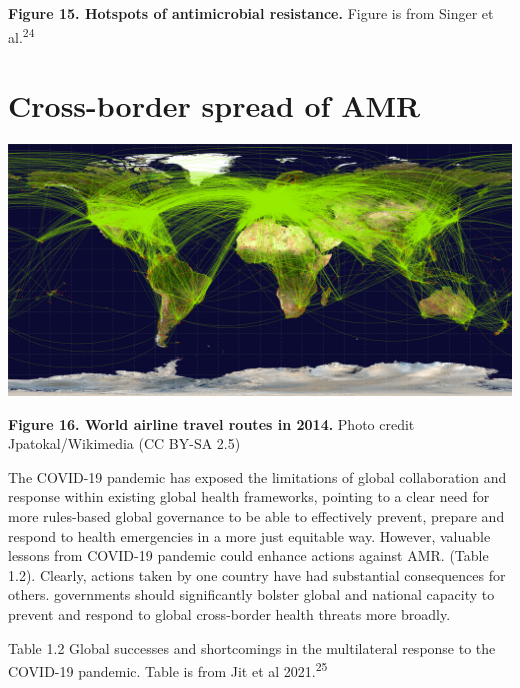 \documentclass[
]{book}
\begin{document}
\textbf{Figure 15. Hotspots of antimicrobial resistance.} Figure is from Singer et al.\textsuperscript{24}

\hypertarget{cross-border-spread-of-amr}{%
\section*{Cross-border spread of AMR}\label{cross-border-spread-of-amr}}

\includegraphics[width=8.33333in,height=\textheight]{images/worldairlineroute2014.png}

\textbf{Figure 16. World airline travel routes in 2014.} Photo credit Jpatokal/Wikimedia (CC BY-SA 2.5)

The COVID-19 pandemic has exposed the limitations of global collaboration and response within existing global health frameworks, pointing to a clear need for more rules-based global governance to be able to effectively prevent, prepare and respond to health emergencies in a more just equitable way. However, valuable lessons from COVID-19 pandemic could enhance actions against AMR. (Table 1.2). Clearly, actions taken by one country have had substantial consequences for others. governments should significantly bolster global and national capacity to prevent and respond to global cross-border health threats more broadly.

Table 1.2 Global successes and shortcomings in the multilateral response to the COVID-19 pandemic. Table is from Jit et al 2021.\textsuperscript{25}
\end{document}
